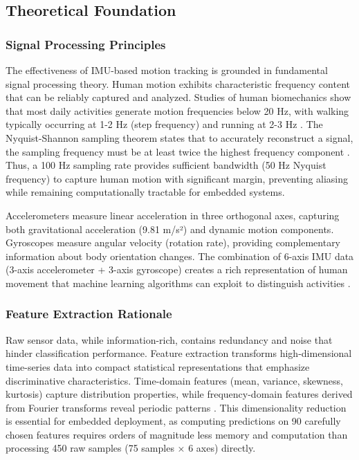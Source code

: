 \subsection{Theoretical Foundation}

\subsubsection{Signal Processing Principles}

The effectiveness of IMU-based motion tracking is grounded in fundamental signal processing theory. Human motion exhibits characteristic frequency content that can be reliably captured and analyzed. Studies of human biomechanics show that most daily activities generate motion frequencies below 20 Hz, with walking typically occurring at 1-2 Hz (step frequency) and running at 2-3 Hz \cite{whittle2014gait}. The Nyquist-Shannon sampling theorem states that to accurately reconstruct a signal, the sampling frequency must be at least twice the highest frequency component \cite{oppenheim1999discrete}. Thus, a 100 Hz sampling rate provides sufficient bandwidth (50 Hz Nyquist frequency) to capture human motion with significant margin, preventing aliasing while remaining computationally tractable for embedded systems.

Accelerometers measure linear acceleration in three orthogonal axes, capturing both gravitational acceleration (9.81 m/s²) and dynamic motion components. Gyroscopes measure angular velocity (rotation rate), providing complementary information about body orientation changes. The combination of 6-axis IMU data (3-axis accelerometer + 3-axis gyroscope) creates a rich representation of human movement that machine learning algorithms can exploit to distinguish activities \cite{filippeschi2017survey_imu}.

\subsubsection{Feature Extraction Rationale}

Raw sensor data, while information-rich, contains redundancy and noise that hinder classification performance. Feature extraction transforms high-dimensional time-series data into compact statistical representations that emphasize discriminative characteristics. Time-domain features (mean, variance, skewness, kurtosis) capture distribution properties, while frequency-domain features derived from Fourier transforms reveal periodic patterns \cite{oppenheim1999discrete}. This dimensionality reduction is essential for embedded deployment, as computing predictions on 90 carefully chosen features requires orders of magnitude less memory and computation than processing 450 raw samples (75 samples × 6 axes) directly.

